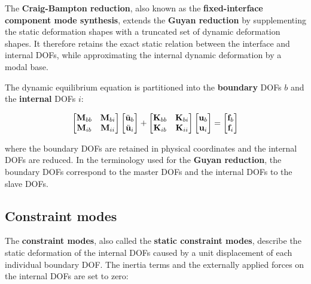 The \textbf{Craig-Bampton reduction}, also known as the \textbf{fixed-interface
component mode synthesis}, extends the \textbf{Guyan reduction} by supplementing
the static deformation shapes with a truncated set of dynamic deformation shapes.
It therefore retains the exact static relation between the interface and internal
DOFs, while approximating the internal dynamic deformation by a modal base.

The dynamic equilibrium equation is partitioned into the \textbf{boundary} DOFs
$ b $ and the \textbf{internal} DOFs $ i $:

\begin{equation}
    \begin{bmatrix}
        \mathbf{M}_{bb} & \mathbf{M}_{bi} \\
        \mathbf{M}_{ib} & \mathbf{M}_{ii}
    \end{bmatrix}
    \begin{bmatrix}
        \ddot{\mathbf{u}}_b \\
        \ddot{\mathbf{u}}_i
    \end{bmatrix}
    +
    \begin{bmatrix}
        \mathbf{K}_{bb} & \mathbf{K}_{bi} \\
        \mathbf{K}_{ib} & \mathbf{K}_{ii}
    \end{bmatrix}
    \begin{bmatrix}
        \mathbf{u}_b \\
        \mathbf{u}_i
    \end{bmatrix}
    =
    \begin{bmatrix}
        \mathbf{f}_b \\
        \mathbf{f}_i
    \end{bmatrix}
\end{equation}

where the boundary DOFs are retained in physical coordinates and the internal DOFs
are reduced. In the terminology used for the \textbf{Guyan reduction}, the boundary
DOFs correspond to the master DOFs and the internal DOFs to the slave DOFs.

\subsection{Constraint modes}

The \textbf{constraint modes}, also called the \textbf{static constraint modes},
describe the static deformation of the internal DOFs caused by a unit displacement
of each individual boundary DOF. The inertia terms and the externally applied
forces on the internal DOFs are set to zero:

